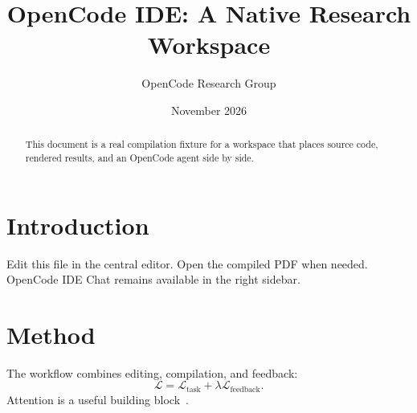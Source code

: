 \documentclass{article}
\title{OpenCode IDE: A Native Research Workspace}
\author{OpenCode Research Group}
\date{November 2026}
\begin{document}
\maketitle
\begin{abstract}
This document is a real compilation fixture for a workspace that places
source code, rendered results, and an OpenCode agent side by side.
\end{abstract}
\section{Introduction}
Edit this file in the central editor. Open the compiled PDF when needed.
OpenCode IDE Chat remains available in the right sidebar.
\section{Method}
The workflow combines editing, compilation, and feedback:
\begin{equation}
  \mathcal{L} = \mathcal{L}_{\mathrm{task}} + \lambda\mathcal{L}_{\mathrm{feedback}}.
\end{equation}
Attention is a useful building block~\cite{vaswani2017attention}.


\end{document}

